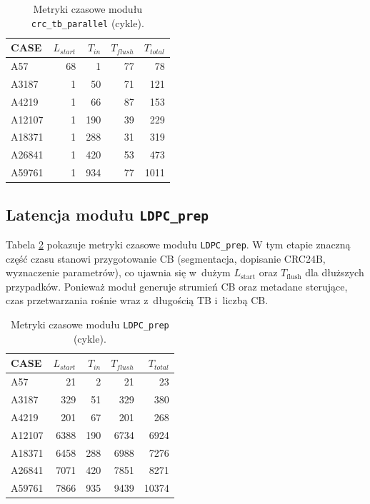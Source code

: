 \begin{table}[!ht]
\centering
\caption{Metryki czasowe modułu \texttt{crc\_tb\_parallel} (cykle).}
\label{tab:lat_crc_tb_parallel}
\begin{tabular}{lrrrr}
\hline
CASE & $L_{start}$ & $T_{in}$ & $T_{flush}$ & $T_{total}$ \\
\hline
A57     & 68 & 1   & 77 & 78 \\
A3187   & 1  & 50  & 71 & 121 \\
A4219   & 1  & 66  & 87 & 153 \\
A12107  & 1  & 190 & 39 & 229 \\
A18371  & 1  & 288 & 31 & 319 \\
A26841  & 1  & 420 & 53 & 473 \\
A59761  & 1  & 934 & 77 & 1011 \\
\hline
\end{tabular}
\end{table}

\subsection{Latencja modułu \texttt{LDPC\_prep}}
\label{subsec:lat_ldpc_prep}

Tabela \ref{tab:lat_ldpc_prep} pokazuje metryki czasowe modułu \texttt{LDPC\_prep}.
W tym etapie znaczną część czasu stanowi przygotowanie CB (segmentacja, dopisanie CRC24B, wyznaczenie parametrów),
co ujawnia się w~dużym $L_{\mathrm{start}}$ oraz $T_{\mathrm{flush}}$ dla dłuższych przypadków.
Ponieważ moduł generuje strumień CB oraz metadane sterujące, czas przetwarzania rośnie wraz z~długością TB i~liczbą CB.


\begin{table}[!ht]
\centering
\caption{Metryki czasowe modułu \texttt{LDPC\_prep} (cykle).}
\label{tab:lat_ldpc_prep}
\begin{tabular}{lrrrr}
\hline
CASE & $L_{start}$ & $T_{in}$ & $T_{flush}$ & $T_{total}$ \\
\hline
A57     & 21   & 2   & 21    & 23 \\
A3187   & 329  & 51  & 329   & 380 \\
A4219   & 201  & 67  & 201   & 268 \\
A12107  & 6388 & 190 & 6734  & 6924 \\
A18371  & 6458 & 288 & 6988  & 7276 \\
A26841  & 7071 & 420 & 7851  & 8271 \\
A59761  & 7866 & 935 & 9439  & 10374 \\
\hline
\end{tabular}
\end{table}

